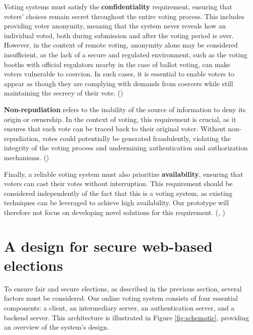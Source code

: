 \documentclass[a4paper,12pt,english]{article}
\begin{document}
Voting systems must satisfy the \textbf{confidentiality} requirement, ensuring that voters’ choices remain secret throughout the entire voting process. This includes providing voter anonymity, meaning that the system never reveals how an individual voted, both during submission and after the voting period is over. However, in the context of remote voting, anonymity alone may be considered insufficient, as the lack of a secure and regulated environment, such as the voting booths with official regulators nearby in the case of ballot voting, can make voters vulnerable to coercion. In such cases, it is essential to enable voters to appear as though they are complying with demands from coercers while still maintaining the secrecy of their vote. (\cite{4531164})

\textbf{Non-repudiation} refers to the inability of the source of information to deny its origin or ownership. In the context of voting, this requirement is crucial, as it ensures that each vote can be traced back to their original voter. Without non-repudiation, votes could potentially be generated fraudulently, violating the integrity of the voting process and undermining authentication and authorization mechanisms. (\cite{yousuf-2011})

Finally, a reliable voting system must also prioritize \textbf{availability}, ensuring that voters can cast their votes without interruption. This requirement should be considered independently of the fact that this is a voting system, as existing techniques can be leveraged to achieve high availability. Our prototype will therefore not focus on developing novel solutions for this requirement. (\cite{challenger1998scalable}, \cite{baker2011megastore})

\section{A design for secure web-based elections}\label{sec:design}

To ensure fair and secure elections, as described in the previous section, several factors must be considered. Our online voting system consists of four essential components: a client, an intermediary server, an authentication server, and a backend server. This architecture is illustrated in Figure \ref{fig:schematic}, providing an overview of the system's design.
\end{document}
